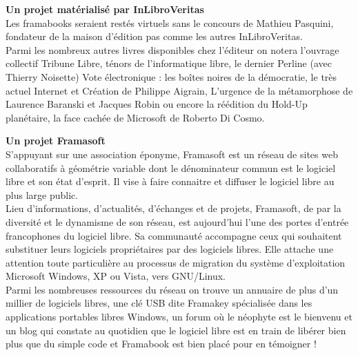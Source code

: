 {\textbf{Un projet matérialisé par InLibroVeritas}\\
Les framabooks seraient restés virtuels sans le concours de Mathieu Pasquini, fondateur de la maison d'édition pas comme les autres InLibroVeritas.\\
Parmi les nombreux autres livres disponibles chez l'éditeur on notera l'ouvrage collectif Tribune Libre, ténors de l'informatique libre, le dernier Perline (avec Thierry Noisette) Vote électronique : les boîtes noires de la démocratie, le très actuel Internet et Création de Philippe Aigrain, L'urgence de la métamorphose de Laurence Baranski et Jacques Robin ou encore la réédition du Hold-Up planétaire, la face cachée de Microsoft de Roberto Di Cosmo.\par
\textbf{Un projet Framasoft}\\
S'appuyant sur une association éponyme, Framasoft est un réseau de sites web collaboratifs à géométrie variable dont le dénominateur commun est le logiciel libre et son état d'esprit. Il vise à faire connaitre et diffuser le logiciel libre au plus large public.\\
Lieu d'informations, d'actualités, d'échanges et de projets, Framasoft, de par la diversité et le dynamisme de son réseau, est aujourd'hui l'une des portes d'entrée francophones du logiciel libre. Sa communauté accompagne ceux qui souhaitent substituer leurs logiciels propriétaires par des logiciels libres. Elle attache une attention toute particulière au processus de migration du système d'exploitation Microsoft Windows, XP ou Vista, vers GNU/Linux.\\
Parmi les nombreuses ressources du réseau on trouve un annuaire de plus d'un millier de logiciels libres, une clé USB dite Framakey spécialisée dans les applications portables libres Windows, un forum où le néophyte est le bienvenu et un blog qui constate au quotidien que le logiciel libre est en train de libérer bien plus que du simple code et Framabook est bien placé pour en témoigner !
}
